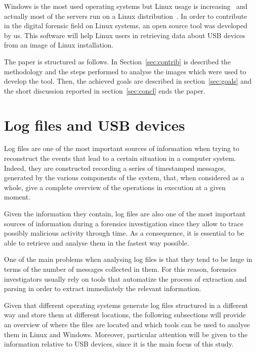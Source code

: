 \documentclass[a4paper]{article}
\begin{document}
Windows is the most used operating systems but Linux usage is
increasing~\cite{osShare} and actually most of the servers run on a Linux
distribution~\cite{InternetServer}. In order to contribute in the digital
forensic field on Linux systems, an open source tool was developed by us. This
software will help Linux users in retrieving data about USB devices from an
image of Linux installation.

The paper is structured as follows. In Section~\ref{sec:contrib} is described
the methodology and the steps performed to analyse the images which were used to
develop the tool. Then, the achieved goals are described in
section~\ref{sec:goals} and the short discussion reported in
section~\ref{sec:concl} ends the paper.

\section{Log files and USB devices}
\label{sec:lit}
Log files are one of the most important sources of information when trying to
reconstruct the events that lead to a certain situation in a computer system.
Indeed, they are constructed recording a series of timestamped messages,
generated by the various components of the system, that, when considered as a
whole, give a complete overview of the operations in execution at a given
moment.

Given the information they contain, log files are also one of the most important
sources of information during a forensics investigation since they allow to
trace possibly malicious activity through time. As a consequence, it is
essential to be able to retrieve and analyse them in the fastest way
possible.~\cite{finlayson1987log}

One of the main problems when analysing log files is that they tend to be huge
in terms of the number of messages collected in them. For this reason, forensics
investigators usually rely on tools that automatize the process of extraction
and parsing in order to extract immediately the relevant information.

Given that different operating systems generate log files structured in a
different way and store them at different locations, the following subsections
will provide an overview of where the files are located and which tools can
be used to analyse them in Linux and Windows. Moreover, particular attention
will be given to the information relative to USB devices, since it is the main
focus of this study.
\end{document}

